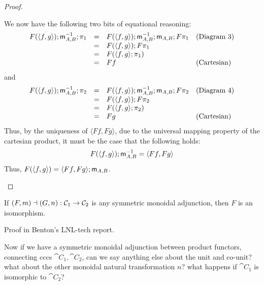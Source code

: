 \begin{proof}
\begin{itemize}
    We now have the following two bits of equational reasoning:
    \[
    \begin{array}{lllll}
      F(\langle f,g \rangle);\mathsf{m}_{A,B}^{-1};\pi_1
      & = & F(\langle f,g \rangle);\mathsf{m}_{A,B}^{-1};\mathsf{m}_{A,B};F\pi_1 & \text{(Diagram 3)}\\
      & = & F(\langle f,g \rangle);F\pi_1 & \text{}\\
      & = & F(\langle f,g \rangle;\pi_1) & \text{}\\
      & = & Ff & \text{(Cartesian)}\\
    \end{array}      
    \]
    and
    \[
    \begin{array}{lllll}
      F(\langle f,g \rangle);\mathsf{m}_{A,B}^{-1};\pi_2
      & = & F(\langle f,g \rangle);\mathsf{m}_{A,B}^{-1};\mathsf{m}_{A,B};F\pi_2 & \text{(Diagram 4)}\\
      & = & F(\langle f,g \rangle);F\pi_2 & \text{}\\
      & = & F(\langle f,g \rangle;\pi_2) & \text{}\\
      & = & Fg & \text{(Cartesian)}\\
    \end{array}      
    \]
    Thus, by the uniqueness of $\langle Ff,Fg \rangle$, due to the
    universal mapping property of the cartesian product, it must be
    the case that the following holds:
    \[
    F(\langle f,g \rangle);\mathsf{m}_{A,B}^{-1} = \langle Ff,Fg \rangle
    \]
    Thus, $F(\langle f,g \rangle) = \langle Ff,Fg \rangle;\mathsf{m}_{A,B}$.
  \end{itemize}  
\end{proof}

\begin{lemma}
  \label{lemma:product_functors_iso}
  If $(F,m)\dashv (G,n) : \mathcal{C}_1 \rightarrow \mathcal{C}_2$ is any symmetric monoidal adjunction, then
  $F$  is an 
  isomorphism. 
\end{lemma}
Proof in Benton's LNL-tech report.

Now if we have a symmetric monoidal adjunction between product functors, connecting cccs $\cat{C}_1, \cat{C}_2$, can we say anything else about the unit and co-unit? what about the other monoidal natural transformation $n$? what happens if $\cat{C}_1$ is isomorphic to $\cat{C}_2$?
